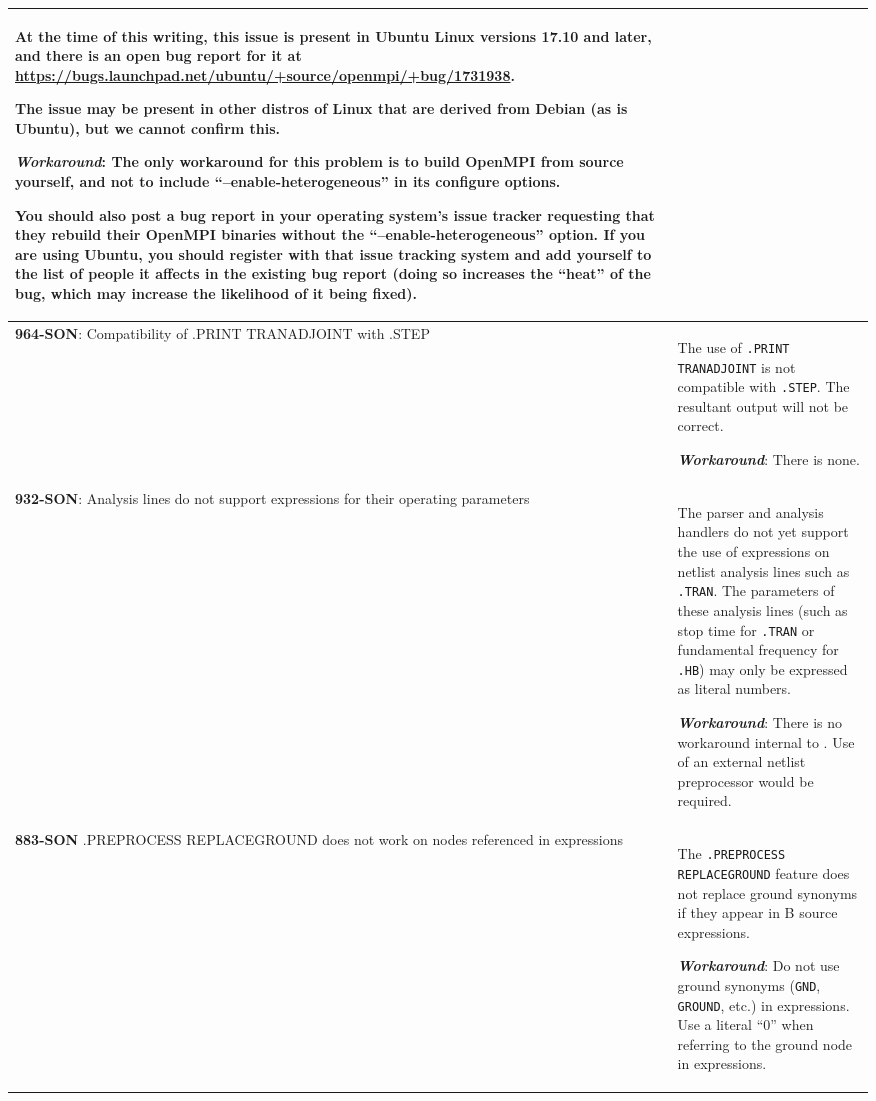 {\begin{longtable}[h] {>{\raggedright\small}m{2in}|>{\raggedright\let\\\tabularnewline\small}m{3.5in}}
At the time of this writing, this issue is present in Ubuntu Linux
versions 17.10 and later, and there is an open bug report for it
at \url{https://bugs.launchpad.net/ubuntu/+source/openmpi/+bug/1731938}.

The issue may be present in other distros of Linux that are derived
from Debian (as is Ubuntu), but we cannot confirm this.

\textbf{\textit{Workaround}}:
The only workaround for this problem is to build OpenMPI from source
yourself, and not to include ``--enable-heterogeneous'' in its
configure options.

You should also post a bug report in your operating system's issue
tracker requesting that they rebuild their OpenMPI binaries without
the ``--enable-heterogeneous'' option.  If you are using Ubuntu, you
should register with that issue tracking system and add yourself to
the list of people it affects in the existing bug report (doing so
increases the ``heat'' of the bug, which may increase the likelihood
of it being fixed).

\\ \hline

\textbf{964-SON}: Compatibility of .PRINT TRANADJOINT with .STEP & The use of
\texttt{.PRINT TRANADJOINT} is not compatible with \texttt{.STEP}.  The
resultant \Xyce{} output will not be correct.

\textbf{\textit{Workaround}}: There is none.
\\ \hline

\textbf{932-SON}: Analysis lines do not support expressions for their
operating parameters & The \Xyce{} parser and analysis handlers do not
yet support the use of expressions on netlist analysis lines such
as \texttt{.TRAN}.  The parameters of these analysis lines (such as
stop time for \texttt{.TRAN} or fundamental frequency
for \texttt{.HB}) may only be expressed as literal numbers.

\textbf{\textit{Workaround}}: There is no workaround internal to \Xyce{}.
Use of an external netlist preprocessor would be required. \\ \hline

\textbf{883-SON} .PREPROCESS REPLACEGROUND does not work on nodes referenced
in expressions & The \texttt{.PREPROCESS REPLACEGROUND} feature does
not replace ground synonyms if they appear in B source expressions.

\textbf{\textit{Workaround}}: Do not use ground synonyms (\texttt{GND},
\texttt{GROUND}, etc.) in expressions.  Use a literal ``0'' when
referring to the ground node in expressions.\\ \hline


\end{longtable}}
